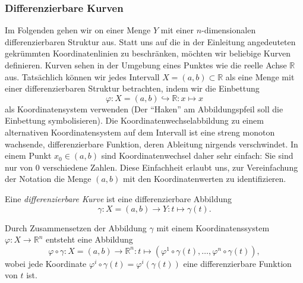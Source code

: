 \subsubsection{Differenzierbare Kurven}
Im Folgenden gehen wir on einer Menge $Y$ mit einer $n$-dimensionalen
differenzierbaren Struktur aus.
Statt uns auf die in der Einleitung angedeuteten gekrümmten
Koordinatenlinien zu beschränken, möchten wir beliebige Kurven
definieren.
Kurven sehen in der Umgebung eines Punktes wie die reelle Achse
$\mathbb{R}$ aus.
Tatsächlich können wir jedes Intervall $X=(a,b)\subset\mathbb{R}$ als
eine Menge mit einer differenzierbaren Struktur betrachten, indem
wir die Einbettung
\[
\varphi
\colon
X=(a,b) \hookrightarrow \mathbb{R}
:
x\mapsto x
\]
als Koordinatensystem verwenden (Der ``Haken'' am Abbildungspfeil
soll die Einbettung symbolisieren).
Die Koordinatenwechselabbildung zu einem alternativen Koordinatensystem
auf dem Intervall ist eine streng monoton wachsende, differenzierbare
Funktion, deren Ableitung nirgends verschwindet.
In einem Punkt $x_0\in (a,b)$ sind Koordinatenwechsel daher sehr
einfach: Sie sind nur von 0 verschiedene Zahlen.
Diese Einfachheit erlaubt uns, zur Vereinfachung der Notation die Menge
$(a,b)$ mit den Koordinatenwerten zu identifizieren.

\begin{definition}
Eine {\em differenzierbare Kurve}
%
%
ist eine differenzierbare Abbildung
\[
\gamma
\colon
X = (a,b) \to Y
:
t \mapsto \gamma(t).
\]
\end{definition}

Durch Zusammensetzen der Abbildung $\gamma$ mit einem Koordinatenssystem
$\varphi\colon X\to \mathbb{R}^n$ entsteht eine Abbildung 
\[
\varphi\circ\gamma
\colon
X=(a,b) \to \mathbb{R}^n
:
t \mapsto (\varphi^1\circ \gamma(t),\dots,\varphi^n\circ\gamma(t)),
\]
wobei jede Koordinate $\varphi^i\circ\gamma(t) = \varphi^i(\gamma(t))$
eine differenzierbare Funktion von $t$ ist.

